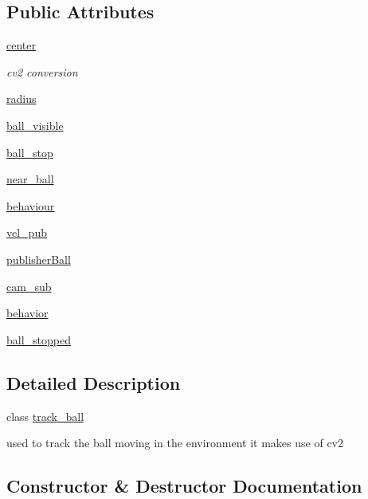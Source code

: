 \subsection*{Public Attributes}
\begin{DoxyCompactItemize}
\item 
\hyperlink{classopencv__tracking_1_1track__ball_a92050fb578b1e2e7bea37b0abdbf26aa}{center}
\begin{DoxyCompactList}\small\item\em cv2 conversion \end{DoxyCompactList}\item 
\hyperlink{classopencv__tracking_1_1track__ball_ae497b649948b1e33fb3cc71b01646da3}{radius}
\item 
\hyperlink{classopencv__tracking_1_1track__ball_a2fd263ce72f097474d63022a51a1aff9}{ball\+\_\+visible}
\item 
\hyperlink{classopencv__tracking_1_1track__ball_a0cef778dc02f2169211f2e756d94db7b}{ball\+\_\+stop}
\item 
\hyperlink{classopencv__tracking_1_1track__ball_a38f20351ab0571002f7552aed7bb6979}{near\+\_\+ball}
\item 
\hyperlink{classopencv__tracking_1_1track__ball_ace82efcb5e44b826ac65d61642b447a8}{behaviour}
\item 
\hyperlink{classopencv__tracking_1_1track__ball_a09ab81e992a70d22568ed1f6c556d1bb}{vel\+\_\+pub}
\item 
\hyperlink{classopencv__tracking_1_1track__ball_ad351c91525368a89ff0a7bb1d257b3d1}{publisher\+Ball}
\item 
\hyperlink{classopencv__tracking_1_1track__ball_aaefd39e73e7ee6f26d43bd19d6eaedaf}{cam\+\_\+sub}
\item 
\hyperlink{classopencv__tracking_1_1track__ball_aab7a7dae7030c9b39e7bfc1d892b5720}{behavior}
\item 
\hyperlink{classopencv__tracking_1_1track__ball_acadb95d5c5810d9595630db5beaf9748}{ball\+\_\+stopped}
\end{DoxyCompactItemize}


\subsection{Detailed Description}
class \hyperlink{classopencv__tracking_1_1track__ball}{track\+\_\+ball} 

used to track the ball moving in the environment it makes use of cv2 

\subsection{Constructor \& Destructor Documentation}
